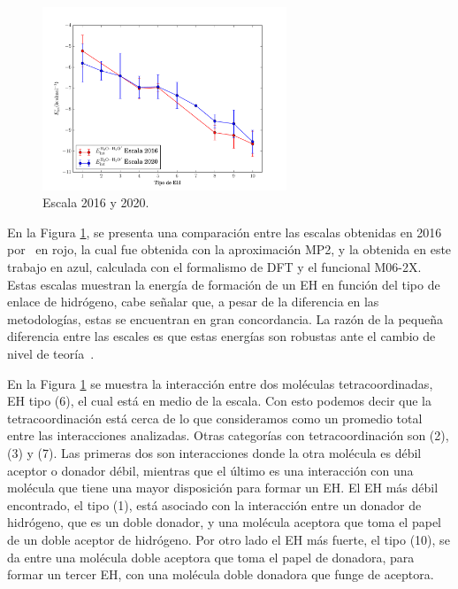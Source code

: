 \begin{figure}
    \centering
    \includegraphics[width=0.65\textwidth]{4/img/New_vs_old_barraerror}
    \caption{Escala 2016 y 2020.}
\label{2016_vs_2020}
\end{figure}

En la Figura \ref{2016_vs_2020}, se presenta una comparación entre las escalas
obtenidas en 2016 por~ en rojo, la cual fue obtenida con la
aproximación MP2, y la obtenida en este trabajo en azul, calculada con el
formalismo de DFT y el funcional M06-2X. Estas escalas muestran la energía de
formación de un EH en función del tipo de enlace de hidrógeno, cabe señalar
que, a pesar de la diferencia en las metodologías, estas se encuentran en gran
concordancia. La razón de la pequeña diferencia entre las escales es que estas
energías son robustas ante el cambio de nivel de
teoría~\cite{JimenezGravalos2019}.

En la Figura \ref{2016_vs_2020} se muestra la interacción entre dos moléculas
tetracoordinadas, EH tipo (6), el cual está en medio de la escala. Con esto
podemos decir que la tetracoordinación está cerca de lo que consideramos como
un promedio total entre las interacciones analizadas. Otras categorías con
tetracoordinación son (2), (3) y (7). Las primeras dos son interacciones donde
la otra molécula es débil aceptor o donador débil, mientras que el último es
una interacción con una molécula que tiene una mayor disposición para formar un
EH. El EH más débil encontrado, el tipo (1), está asociado con la
in\-te\-rac\-ción entre un donador de hidrógeno, que es un doble donador, y una
molécula aceptora que toma el papel de un doble aceptor de hidrógeno. Por otro
lado el EH más fuerte, el tipo (10), se da entre una molécula doble aceptora
que toma el papel de donadora, para formar un tercer EH, con una molécula doble
donadora que funge de aceptora. 
%
%
%

